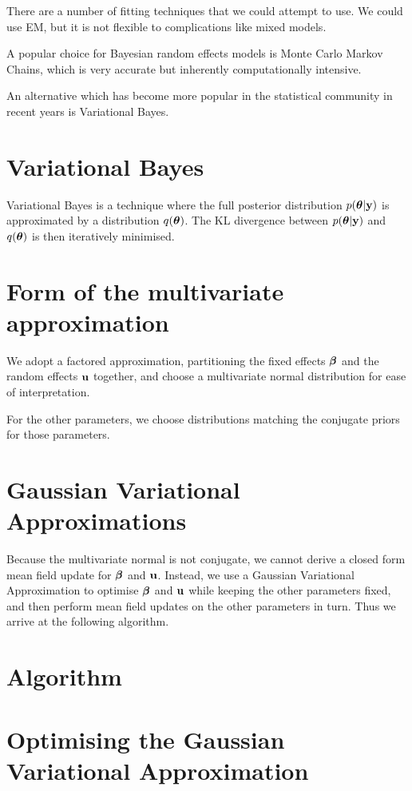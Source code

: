 \documentclass{amsart}
\begin{document}
There are a number of fitting techniques that we could attempt to use. We could use EM, but it is not flexible
to complications like mixed models.

A popular choice for Bayesian random effects models is Monte Carlo Markov Chains, which is very accurate but inherently computationally intensive.

An alternative which has become more popular in the statistical community in recent years is Variational
Bayes.

\section{Variational Bayes}

Variational Bayes is a technique where the full posterior distribution $p({\boldsymbol \theta} | {\bf y})$ is approximated
by a distribution $q({\boldsymbol \theta})$. The KL divergence between $p({\boldsymbol \theta} | {\bf y})$ and $q({\boldsymbol \theta})$ is then
iteratively minimised.

\section{Form of the multivariate approximation}

We adopt a factored approximation, partitioning the fixed effects ${\boldsymbol \beta}$ and the random effects ${\bf u}$
together, and choose a multivariate normal distribution for ease of interpretation.

For the other parameters, we choose distributions matching the conjugate priors for those parameters.

\section{Gaussian Variational Approximations}

Because the multivariate normal is not conjugate, we cannot derive a closed form mean field update for
${\boldsymbol \beta}$ and ${\bf u}$. Instead, we use a Gaussian Variational Approximation to optimise ${\boldsymbol \beta}$ and ${\bf u}$
while keeping the other parameters fixed, and then perform mean field updates on the other parameters in turn.
Thus we arrive at the following algorithm.

\section{Algorithm}

\section{Optimising the Gaussian Variational Approximation}
\end{document}
